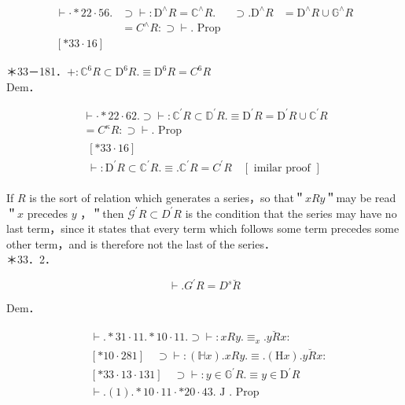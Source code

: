 \documentclass[10pt]{article}
\begin{document}
$$
\begin{array}{rlrl}
\vdash \cdot * 22 \cdot 56 . & \supset \vdash: \mathrm{D}^{\wedge} R=\mathbb{C}^{\wedge} R . & \supset . \mathrm{D}^{\wedge} R & =\mathrm{D}^{\wedge} R \cup \mathbb{G}^{\wedge} R \\
& =C^{\wedge} R: \supset \vdash . \text { Prop } \\
{[* 33 \cdot 16]} &
\end{array}
$$

＊33－181．$+: \mathbb{C}^{6} R \subset \mathrm{D}^{6} R . \equiv \mathrm{D}^{6} R=C^{6} R$\\
Dem．

$$
\begin{aligned}
& \vdash \cdot * 22 \cdot 62 . \supset \vdash: \mathbb{C}^{\prime} R \subset \mathbb{D}^{\prime} R . \equiv \mathrm{D}^{\prime} R=\mathrm{D}^{\prime} R \cup \mathbb{C}^{\prime} R \\
& =C^{\kappa} R: \supset \vdash . \text { Prop } \\
& \begin{array}{ll}
{[* 33 \cdot 16]} & \\
\vdash: \mathrm{D}^{\prime} R \subset \mathbb{C}^{\prime} R . \equiv . \mathbb{C}^{\prime} R=C^{\prime} R \quad[\text { imilar proof }]
\end{array}
\end{aligned}
$$

If $R$ is the sort of relation which generates a series，so that＂$x R y$＂may be read＂$x$ precedes $y$ ，＂then $\mathcal{G}^{\prime} R \subset D^{\prime} R$ is the condition that the series may have no last term，since it states that every term which follows some term precedes some other term，and is therefore not the last of the series．\\
＊33．2．

$$
\vdash . G^{\prime} R=D^{s} \breve{R}
$$

Dem．


\begin{align*}
& \vdash . * 31 \cdot 11 . * 10 \cdot 11 . \supset \vdash: x R y . \equiv_{x} . y \breve{R} x: \\
& {[* 10 \cdot 281] \quad \supset \vdash:(\mathbb{H} x) . x R y . \equiv .(\mathrm{H} x) . y \breve{R} x:} \\
& {[* 33 \cdot 13 \cdot 131] \quad \supset \vdash: y \in \mathbb{G}^{\prime} R . \equiv y \in \mathrm{D}^{\prime} R}  \tag{1}\\
& \vdash .(1) . * 10 \cdot 11 \cdot * 20 \cdot 43 . \text { J } . \text { Prop }
\end{align*}
\end{document}
